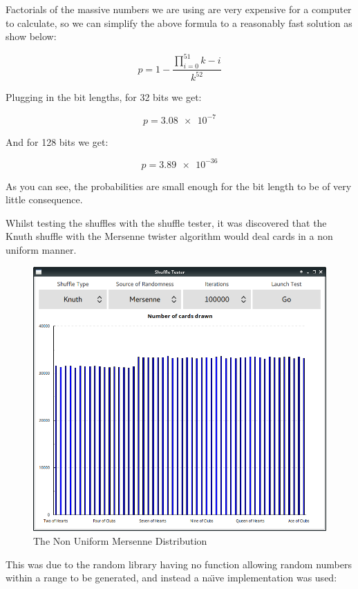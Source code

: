 Factorials of the massive numbers we are using are very expensive for a
computer to calculate, so we can simplify the above formula to a reasonably
fast solution as show below:

\begin{equation}
p = 1 - \frac{\displaystyle\prod_{i=0}^{51} k - i}{k^{52}}
\end{equation}

Plugging in the bit lengths, for 32 bits we get:

\begin{equation}
p = 3.08\num{e-7}
\end{equation}

And for 128 bits we get:

\begin{equation}
p = 3.89\num{e-36}
\end{equation}

As you can see, the probabilities are small enough for the bit length to be
of very little consequence.

Whilst testing the shuffles with the shuffle tester, it was discovered that
the Knuth shuffle with the Mersenne twister algorithm would deal cards in a
non uniform manner.

\begin{figure}[H]
    \centering
    \includegraphics[width=0.8\linewidth]{../images/faultymersenne.png}
    \caption{The Non Uniform Mersenne Distribution}%
    \label{fig:faultymersenne}
\end{figure}

This was due to the random library having no function allowing random numbers
within a range to be generated, and instead a na\"{\i}ve implementation was
used:

